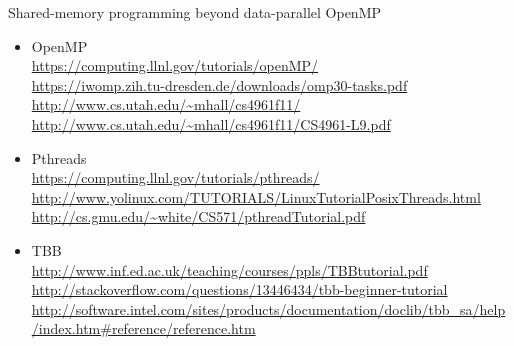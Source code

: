 \begin{frame}{Shared-memory programming beyond data-parallel OpenMP}

  \begin{itemize} 

  \item OpenMP \\
{\tiny \url{https://computing.llnl.gov/tutorials/openMP/}} \\

{\tiny \url{https://iwomp.zih.tu-dresden.de/downloads/omp30-tasks.pdf}}\\

{\tiny \url{http://www.cs.utah.edu/~mhall/cs4961f11/}}\\

{\tiny \url{http://www.cs.utah.edu/~mhall/cs4961f11/CS4961-L9.pdf}}\\

\item Pthreads\\

{\tiny \url{https://computing.llnl.gov/tutorials/pthreads/ }}\\

{\tiny \url{http://www.yolinux.com/TUTORIALS/LinuxTutorialPosixThreads.html}}\\

{\tiny \url{http://cs.gmu.edu/~white/CS571/pthreadTutorial.pdf}}\\

\item TBB \\

{\tiny \url{http://www.inf.ed.ac.uk/teaching/courses/ppls/TBBtutorial.pdf}}\\

{\tiny \url{http://stackoverflow.com/questions/13446434/tbb-beginner-tutorial}}\\

{\tiny \url{http://software.intel.com/sites/products/documentation/doclib/tbb\_sa/help/index.htm\#reference/reference.htm}}

\end{itemize}
  
\end{frame}

